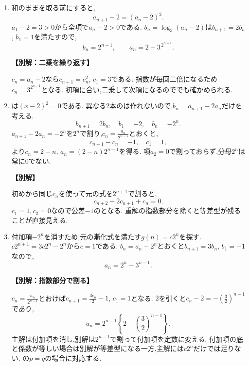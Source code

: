 \begin{enumerate}[label=\textbf{問\arabic*.},leftmargin=3.8em,format=\bookitemlink{practice-basic}{solution}{problem}]
  \item {}\BookMathLayout{}{\\}
    和のままを取る前にすると,
    \[
      a_{n+1}-2=(a_n-2)^2.
    \]
    $a_1-2=3>0$から全項で$a_n-2>0$である.
    $b_n=\log_3(a_n-2)$は$b_{n+1}=2b_n$, $b_1=1$を満たすので,
    \[
      b_n=2^{n-1},\qquad a_n=2+3^{\,2^{n-1}}.
    \]
    \par\smallskip\noindent\textbf{【別解：二乗を繰り返す】}\par
    $c_n=a_n-2$なら$c_{n+1}=c_n^2$, $c_1=3$である.
    指数が毎回二倍になるため$c_n=3^{2^{n-1}}$となる.
    初項に合い,二乗して次項になるのででも確かめられる.

  \item {}\BookMathLayout{}{\\}
    は$(x-2)^2=0$である.
    異なる2本のは作れないので,$b_n=a_{n+1}-2a_n$だけを考える.
    \[
      b_{n+1}=2b_n,\quad b_1=-2,\quad b_n=-2^n.
    \]
    $a_{n+1}-2a_n=-2^n$を$2^n$で割り,$c_n=\frac{a_n}{2^{n-1}}$とおくと,
    \[
      c_{n+1}-c_n=-1,\quad c_1=1,
    \]
    より$c_n=2-n$, $a_n=(2-n)2^{n-1}$を得る.
    項$a_2=0$で割っておらず,分母$2^n$は常に0でない.
    \par\smallskip\noindent\textbf{【別解】}\par
    初めから同じ$c_n$を使って元の式を$2^{n+1}$で割ると,
    \[
      c_{n+2}-2c_{n+1}+c_n=0.
    \]
    $c_1=1,c_2=0$なので公差$-1$のとなる.
    重解の指数部分を除くと等差型が残ることが直接見える.

  \item {}\BookMathLayout{}{\\}
    付加項$-2^n$を消すため,元の漸化式を満たす$g(n)=c2^n$を探す.
    $c2^{n+1}=3c2^n-2^n$から$c=1$である.
    $b_n=a_n-2^n$とおくと$b_{n+1}=3b_n$, $b_1=-1$なので,
    \[
      a_n=2^n-3^{n-1}.
    \]
    \par\smallskip\noindent\textbf{【別解：指数部分で割る】}\par
    $c_n=\frac{a_n}{2^{n-1}}$とおけば$c_{n+1}=\frac{3c_n}{2}-1$, $c_1=1$となる.
    $2$を引くと$c_n-2=-\left(\frac{3}{2}\right)^{n-1}$であり,
    \[
      a_n=2^{n-1}\left\{2-\left(\frac32\right)^{n-1}\right\}.
    \]
    主解は付加項を消し,別解は$2^{n-1}$で割って付加項を定数に変える.
    付加項の底と係数が等しい場合は別解が等差型になる一方,主解には$c2^n$だけでは足りない.
    の$p=q$の場合に対応する.


\end{enumerate}

